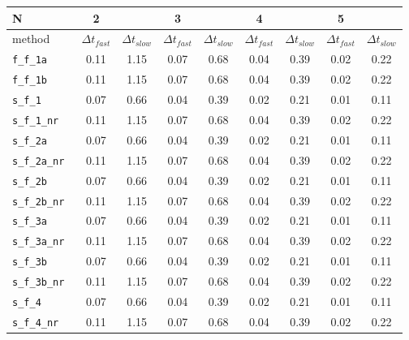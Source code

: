 \begin{tabular}{l|cc|cc|cc|cc}
N& 2  &  & 3  &  & 4  &  & 5  &  \\
\hline
method& $\Delta t_{fast}$  & $\Delta t_{slow}$& $\Delta t_{fast}$  & $\Delta t_{slow}$& $\Delta t_{fast}$  & $\Delta t_{slow}$& $\Delta t_{fast}$  & $\Delta t_{slow}$\\
\hline
\verb|f_f_1a | & 0.11 & 1.15 & 0.07 & 0.68 & 0.04 & 0.39 & 0.02 & 0.22 \\
\verb|f_f_1b | & 0.11 & 1.15 & 0.07 & 0.68 & 0.04 & 0.39 & 0.02 & 0.22 \\
\verb|s_f_1 | & 0.07 & 0.66 & 0.04 & 0.39 & 0.02 & 0.21 & 0.01 & 0.11 \\
\verb|s_f_1_nr | & 0.11 & 1.15 & 0.07 & 0.68 & 0.04 & 0.39 & 0.02 & 0.22 \\
\verb|s_f_2a | & 0.07 & 0.66 & 0.04 & 0.39 & 0.02 & 0.21 & 0.01 & 0.11 \\
\verb|s_f_2a_nr | & 0.11 & 1.15 & 0.07 & 0.68 & 0.04 & 0.39 & 0.02 & 0.22 \\
\verb|s_f_2b | & 0.07 & 0.66 & 0.04 & 0.39 & 0.02 & 0.21 & 0.01 & 0.11 \\
\verb|s_f_2b_nr | & 0.11 & 1.15 & 0.07 & 0.68 & 0.04 & 0.39 & 0.02 & 0.22 \\
\verb|s_f_3a | & 0.07 & 0.66 & 0.04 & 0.39 & 0.02 & 0.21 & 0.01 & 0.11 \\
\verb|s_f_3a_nr | & 0.11 & 1.15 & 0.07 & 0.68 & 0.04 & 0.39 & 0.02 & 0.22 \\
\verb|s_f_3b | & 0.07 & 0.66 & 0.04 & 0.39 & 0.02 & 0.21 & 0.01 & 0.11 \\
\verb|s_f_3b_nr | & 0.11 & 1.15 & 0.07 & 0.68 & 0.04 & 0.39 & 0.02 & 0.22 \\
\verb|s_f_4 | & 0.07 & 0.66 & 0.04 & 0.39 & 0.02 & 0.21 & 0.01 & 0.11 \\
\verb|s_f_4_nr | & 0.11 & 1.15 & 0.07 & 0.68 & 0.04 & 0.39 & 0.02 & 0.22 \\
\hline
\end{tabular}
